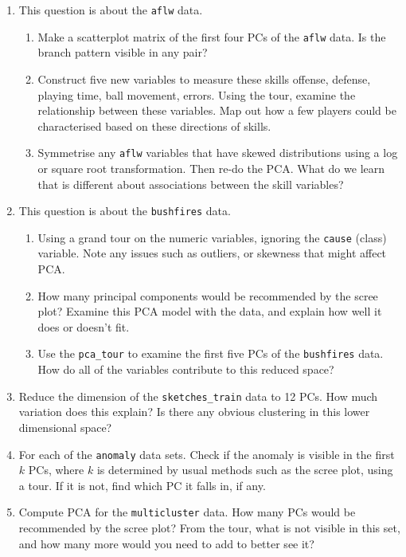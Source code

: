 \documentclass[
  letterpaper,
]{krantz}
\providecommand{\tightlist}{%
  \setlength{\itemsep}{0pt}\setlength{\parskip}{0pt}}
\begin{document}
\begin{enumerate}
\def\labelenumi{\arabic{enumi}.}
\tightlist
\item
  This question is about the \texttt{aflw} data.

  \begin{enumerate}
  \def\labelenumii{\alph{enumii}.}
  \tightlist
  \item
    Make a scatterplot matrix of the first four PCs of the \texttt{aflw}
    data. Is the branch pattern visible in any pair?
  \item
    Construct five new variables to measure these skills offense,
    defense, playing time, ball movement, errors. Using the tour,
    examine the relationship between these variables. Map out how a few
    players could be characterised based on these directions of skills.
  \item
    Symmetrise any \texttt{aflw} variables that have skewed
    distributions using a log or square root transformation. Then re-do
    the PCA. What do we learn that is different about associations
    between the skill variables?
  \end{enumerate}
\item
  This question is about the \texttt{bushfires} data.

  \begin{enumerate}
  \def\labelenumii{\alph{enumii}.}
  \tightlist
  \item
    Using a grand tour on the numeric variables, ignoring the
    \texttt{cause} (class) variable. Note any issues such as outliers,
    or skewness that might affect PCA.
  \item
    How many principal components would be recommended by the scree
    plot? Examine this PCA model with the data, and explain how well it
    does or doesn't fit.
  \item
    Use the \texttt{pca\_tour} to examine the first five PCs of the
    \texttt{bushfires} data. How do all of the variables contribute to
    this reduced space?
  \end{enumerate}
\item
  Reduce the dimension of the \texttt{sketches\_train} data to 12 PCs.
  How much variation does this explain? Is there any obvious clustering
  in this lower dimensional space?
\item
  For each of the \texttt{anomaly} data sets. Check if the anomaly is
  visible in the first \(k\) PCs, where \(k\) is determined by usual
  methods such as the scree plot, using a tour. If it is not, find which
  PC it falls in, if any.
\item
  Compute PCA for the \texttt{multicluster} data. How many PCs would be
  recommended by the scree plot? From the tour, what is not visible in
  this set, and how many more would you need to add to better see it?
\end{enumerate}
\end{document}
